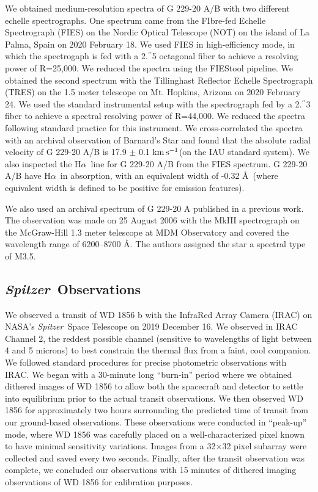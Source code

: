 \documentclass{nature3}
\newcommand{\farcs}{\mbox{\ensuremath{.\!\!^{\prime\prime}}}}%
\newcommand{\halpha}{H$\alpha$}
\newcommand{\project}[1]{\textsl{#1}}
\newcommand{\Spitzer}{\project{Spitzer}}
\newcommand{\kms}{\ensuremath{\rm km\,s^{-1}}}
\begin{document}
\begin{methods}
We obtained medium-resolution spectra of G 229-20 A/B with two different echelle spectrographs. One spectrum came from the FIbre-fed Echelle Spectrograph (FIES\cite{fies}) on the Nordic Optical Telescope (NOT) on the island of La Palma, Spain on 2020 February 18. We used FIES in high-efficiency mode, in which the spectrogaph is fed with a 2\farcs5 octagonal fiber to achieve a resolving power of R=25,000. We reduced the spectra using the FIEStool pipeline\cite{fiestool}. We obtained the second spectrum with the Tillinghast Reflector Echelle Spectrograph (TRES\cite{gaborthesis}) on the 1.5 meter telescope on Mt. Hopkins, Arizona on 2020 February 24. We used the standard instrumental setup with the spectrograph fed by a 2\farcs3 fiber to achieve a spectral resolving power of R=44,000. We reduced the spectra following standard practice for this instrument\cite{buchhave2012}. We cross-correlated the spectra with an archival observation of Barnard's Star and found that the absolute radial velocity of G 229-20 A/B is 17.9 $\pm$ 0.1 \kms (on the IAU standard system\cite{stefanik}). We also inspected the \halpha\ line for G 229-20 A/B  from the FIES spectrum. G 229-20 A/B have \halpha\ in absorption, with an equivalent width of -0.32 \AA\ (where equivalent width is defined to be positive for emission features). 

We also used an archival spectrum of G 229-20 A published in a previous work\cite{lepine}. The observation was made on 25 August 2006 with the MkIII spectrograph on the McGraw-Hill 1.3 meter telescope at MDM Observatory and covered the wavelength range of 6200–8700 \AA.  The authors assigned the star a spectral type of M3.5.


\subsection{\Spitzer\ Observations}
We observed a transit of WD 1856 b with the InfraRed Array Camera (IRAC) on NASA's \Spitzer\ Space Telescope on 2019 December 16. We observed in IRAC Channel 2, the reddest possible channel (sensitive to wavelengths of light between 4 and 5 microns) to best constrain the thermal flux from a faint, cool companion. We followed standard procedures for precise photometric observations with IRAC. We began with a 30-minute long ``burn-in'' period where we obtained dithered images of WD 1856 to allow both the spacecraft and detector to settle into equilibrium prior to the actual transit observations. We then observed WD 1856 for approximately two hours surrounding the predicted time of transit from our ground-based observations. These observations were conducted in ``peak-up'' mode, where WD 1856 was carefully placed on a well-characterized pixel known to have minimal sensitivity variations. Images from a 32$\times$32 pixel subarray were collected and saved every two seconds. Finally, after the transit observation was complete, we concluded our observations with 15 minutes of dithered imaging observations of WD 1856 for calibration purposes. 


\end{methods}
\end{document}
